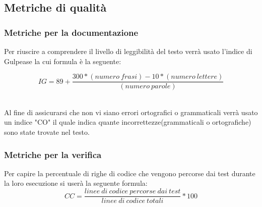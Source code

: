 \subsection{Metriche di qualità}
\subsubsection{Metriche per la documentazione}
Per riuscire a comprendere il livello di leggibilità del testo verrà usato l'indice di Gulpease la cui formula è la seguente:
\begin{center}
\[IG=89+\frac{300*(numero \ frasi)-10*(numero \ lettere)}{(numero \ parole)}\]\\
\end{center}

Al fine di assicurarsi che non vi siano errori ortografici o grammaticali verrà usato un indice "CO" il quale indica quante incorrettezze(grammaticali o ortografiche) sono state trovate nel testo.

\subsubsection{Metriche per la verifica}
Per capire la percentuale di righe di codice che vengono percorse dai test durante la loro esecuzione si userà la seguente formula:
\[CC=\frac{linee \ di \ codice \ percorse \ dai \ test}{linee \ di \ codice \ totali}*100\]\\

 